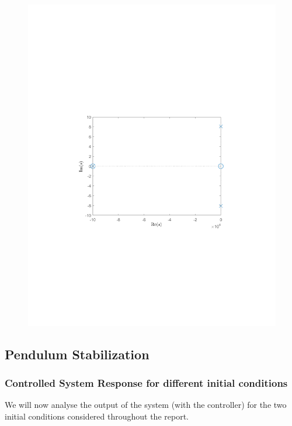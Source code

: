 \documentclass[10pt]{article}
\begin{document}
\begin{figure}[ht]
\begin{minipage}[b]{0.45\textwidth}
        \includegraphics[clip, trim=4.3cm 8.3cm 4.5cm 9.3cm,width=1\linewidth]{lab1/figs/section7_pole_zero_cls.pdf}
    \end{minipage}
\end{figure}

\subsection{Pendulum Stabilization}

\subsubsection{Controlled System Response for different initial conditions}
We will now analyse the output of the system (with the controller) for the two initial conditions considered throughout the report. 
\end{document}
